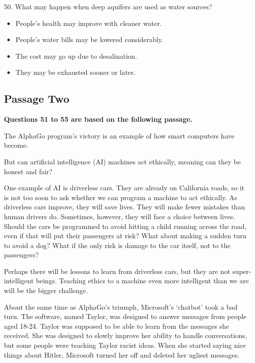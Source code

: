 \documentclass[UTF8,11pt]{ctexart}
\begin{document}
50. What may happen when deep aquifers are used as water sources?


\begin{itemize}[leftmargin=2em,itemsep=.2em,topsep=.4em]\item[A.] People’s health may improve with cleaner water.
\item[B.] People’s water bills may be lowered considerably.
\item[C.] The cost may go up due to desalination.
\item[D.] They may be exhausted sooner or later.
\end{itemize}

\subsection*{\textbf{Passage Two}}


\textbf{Questions 51 to 55 are based on the following passage.}


The AlphaGo program’s victory is an example of how smart computers have become.


But can artificial intelligence (AI) machines act ethically, meaning can they be honest and fair?


One example of AI is driverless cars. They are already on California roads, so it is not too soon to ask whether we can program a machine to act ethically. As driverless cars improve, they will save lives. They will make fewer mistakes than human drivers do. Sometimes, however, they will face a choice between lives. Should the cars be programmed to avoid hitting a child running across the road, even if that will put their passengers at risk? What about making a sudden turn to avoid a dog? What if the only risk is damage to the car itself, not to the passengers?


Perhaps there will be lessons to learn from driverless cars, but they are not super-intelligent beings. Teaching ethics to a machine even more intelligent than we are will be the bigger challenge.


About the same time as AlphaGo’s triumph, Microsoft’s ‘chatbot’ took a bad turn. The software, named Taylor, was designed to answer messages from people aged 18-24. Taylor was supposed to be able to learn from the messages she received. She was designed to slowly improve her ability to handle conversations, but some people were teaching Taylor racist ideas. When she started saying nice things about Hitler, Microsoft turned her off and deleted her ugliest messages.
\end{document}
